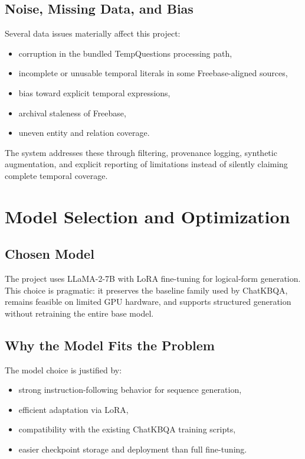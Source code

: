 \documentclass[a4paper,11pt]{article}
\begin{document}
\subsection{Noise, Missing Data, and Bias}

Several data issues materially affect this project:

\begin{itemize}[leftmargin=1.2cm]
  \item corruption in the bundled TempQuestions processing path,
  \item incomplete or unusable temporal literals in some Freebase-aligned sources,
  \item bias toward explicit temporal expressions,
  \item archival staleness of Freebase,
  \item uneven entity and relation coverage.
\end{itemize}

The system addresses these through filtering, provenance logging, synthetic augmentation, and explicit reporting of limitations instead of silently claiming complete temporal coverage.

\section{Model Selection and Optimization}

\subsection{Chosen Model}

The project uses LLaMA-2-7B with LoRA fine-tuning for logical-form generation. This choice is pragmatic: it preserves the baseline family used by ChatKBQA, remains feasible on limited GPU hardware, and supports structured generation without retraining the entire base model.

\subsection{Why the Model Fits the Problem}

The model choice is justified by:

\begin{itemize}[leftmargin=1.2cm]
  \item strong instruction-following behavior for sequence generation,
  \item efficient adaptation via LoRA,
  \item compatibility with the existing ChatKBQA training scripts,
  \item easier checkpoint storage and deployment than full fine-tuning.
\end{itemize}
\end{document}
